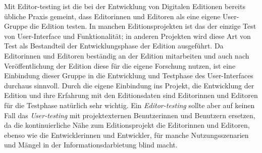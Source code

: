 \documentclass{article}
\begin{document}
        Mit Editor-testing ist die bei der Entwicklung von Digitalen Editionen bereits
                  übliche Praxis gemeint, dass Editorinnen und Editoren als eine eigene User-Gruppe
                  die Edition testen. In manchen Editionsprojekten ist das der einzige Test von
                  User-Interface und Funktionalität; in anderen Projekten wird diese Art von Test
                  als Bestandteil der Entwicklungsphase der Edition ausgeführt. Da Editorinnen und
                  Editoren beständig an der Edition mitarbeiten und auch nach Veröffentlichung der
                  Edition diese für die eigene Forschung nutzen, ist eine Einbindung dieser Gruppe
                  in die Entwicklung und Testphase des User-Interfaces durchaus sinnvoll. Durch die
                  eigene Einbindung ins Projekt, die Entwicklung der Edition und ihre Erfahrung mit
                  den Editionsdaten sind Editorinnen und Editoren für die Testphase natürlich sehr
                  wichtig. Ein \emph{Editor-testing} sollte aber auf keinen Fall das
                     \emph{User-testing} mit projektexternen Benutzerinnen und
                  Benutzern ersetzen, da die kontinuierliche Nähe zum Editionsprojekt die
                  Editorinnen und Editoren, ebenso wie die Entwicklerinnen und Entwickler, für
                  manche Nutzungsszenarien und Mängel in der Informationsdarbietung blind macht.\\
            
\end{document}
